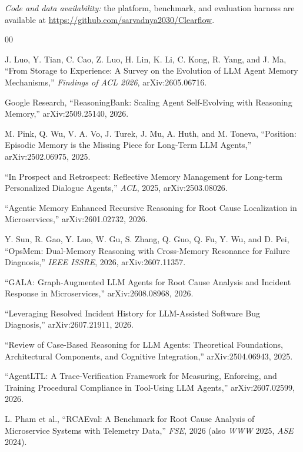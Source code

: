\documentclass[conference]{IEEEtran}
\begin{document}
\textit{Code and data availability:} the platform, benchmark, and evaluation harness are available at
\url{https://github.com/sarvadnya2030/Clearflow}.

\scriptsize
\setlength{\itemsep}{0pt}
\setlength{\parskip}{0pt}
\begin{thebibliography}{00}

 J. Luo, Y. Tian, C. Cao, Z. Luo, H. Lin, K. Li, C. Kong, R. Yang, and J. Ma,
``From Storage to Experience: A Survey on the Evolution of LLM Agent Memory Mechanisms,''
\emph{Findings of ACL 2026}, arXiv:2605.06716.

 Google Research, ``ReasoningBank: Scaling Agent Self-Evolving with Reasoning
Memory,'' arXiv:2509.25140, 2026.

 M. Pink, Q. Wu, V. A. Vo, J. Turek, J. Mu, A. Huth, and M. Toneva,
``Position: Episodic Memory is the Missing Piece for Long-Term LLM Agents,'' arXiv:2502.06975, 2025.

 ``In Prospect and Retrospect: Reflective Memory Management for Long-term Personalized
Dialogue Agents,'' \emph{ACL}, 2025, arXiv:2503.08026.

 ``Agentic Memory Enhanced Recursive Reasoning for Root Cause Localization in
Microservices,'' arXiv:2601.02732, 2026.

 Y. Sun, R. Gao, Y. Luo, W. Gu, S. Zhang, Q. Guo, Q. Fu, Y. Wu, and D. Pei,
``OpsMem: Dual-Memory Reasoning with Cross-Memory Resonance for Failure Diagnosis,'' \emph{IEEE ISSRE},
2026, arXiv:2607.11357.

 ``GALA: Graph-Augmented LLM Agents for Root Cause Analysis and Incident Response in
Microservices,'' arXiv:2608.08968, 2026.

 ``Leveraging Resolved Incident History for LLM-Assisted Software Bug Diagnosis,''
arXiv:2607.21911, 2026.

 ``Review of Case-Based Reasoning for LLM Agents: Theoretical Foundations,
Architectural Components, and Cognitive Integration,'' arXiv:2504.06943, 2025.

 ``AgentLTL: A Trace-Verification Framework for Measuring, Enforcing, and Training
Procedural Compliance in Tool-Using LLM Agents,'' arXiv:2607.02599, 2026.

 L. Pham et al., ``RCAEval: A Benchmark for Root Cause Analysis of Microservice
Systems with Telemetry Data,'' \emph{FSE}, 2026 (also \emph{WWW} 2025, \emph{ASE} 2024).


\end{thebibliography}
\end{document}
